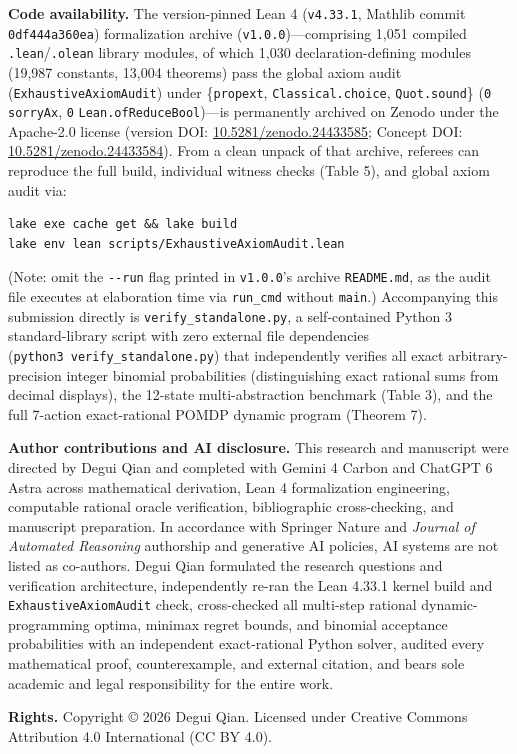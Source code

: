 \documentclass[11pt,a4paper]{article}
\begin{document}
\textbf{Code availability.} The version-pinned Lean 4 (\texttt{v4.33.1},
Mathlib commit \texttt{0df444a360ea}) formalization archive
(\texttt{v1.0.0})---comprising 1,051 compiled
\texttt{.lean}/\texttt{.olean} library modules, of which 1,030
declaration-defining modules (19,987 constants, 13,004 theorems) pass
the global axiom audit (\texttt{ExhaustiveAxiomAudit}) under
\{\texttt{propext}, \texttt{Classical.choice}, \texttt{Quot.sound}\}
(\texttt{0} \texttt{sorryAx}, \texttt{0}
\texttt{Lean.ofReduceBool})---is permanently archived on Zenodo under
the Apache-2.0 license (version DOI:
\href{https://doi.org/10.5281/zenodo.24433585}{10.5281/zenodo.24433585};
Concept DOI:
\href{https://doi.org/10.5281/zenodo.24433584}{10.5281/zenodo.24433584}).
From a clean unpack of that archive, referees can reproduce the full
build, individual witness checks (Table 5), and global axiom audit via:

\begin{verbatim}
lake exe cache get && lake build
lake env lean scripts/ExhaustiveAxiomAudit.lean
\end{verbatim}

(Note: omit the \texttt{-\/-run} flag printed in \texttt{v1.0.0}'s
archive \texttt{README.md}, as the audit file executes at elaboration
time via \texttt{run\_cmd} without \texttt{main}.) Accompanying this
submission directly is \texttt{verify\_standalone.py}, a self-contained
Python 3 standard-library script with zero external file dependencies
(\texttt{python3\ verify\_standalone.py}) that independently verifies
all exact arbitrary-precision integer binomial probabilities
(distinguishing exact rational sums from decimal displays), the 12-state
multi-abstraction benchmark (Table 3), and the full 7-action
exact-rational POMDP dynamic program (Theorem 7).

\textbf{Author contributions and AI disclosure.} This research and
manuscript were directed by Degui Qian and completed with Gemini 4
Carbon and ChatGPT 6 Astra across mathematical derivation, Lean 4
formalization engineering, computable rational oracle verification,
bibliographic cross-checking, and manuscript preparation. In accordance
with Springer Nature and \emph{Journal of Automated Reasoning}
authorship and generative AI policies, AI systems are not listed as
co-authors. Degui Qian formulated the research questions and
verification architecture, independently re-ran the Lean 4.33.1 kernel
build and \texttt{ExhaustiveAxiomAudit} check, cross-checked all
multi-step rational dynamic-programming optima, minimax regret bounds,
and binomial acceptance probabilities with an independent exact-rational
Python solver, audited every mathematical proof, counterexample, and
external citation, and bears sole academic and legal responsibility for
the entire work.

\textbf{Rights.} Copyright © 2026 Degui Qian. Licensed under Creative
Commons Attribution 4.0 International (CC BY 4.0).

\clearpage
\begingroup
\nolinenumbers
{}
\small
\setlength{\bibsep}{5.0pt}


\endgroup
\end{document}
